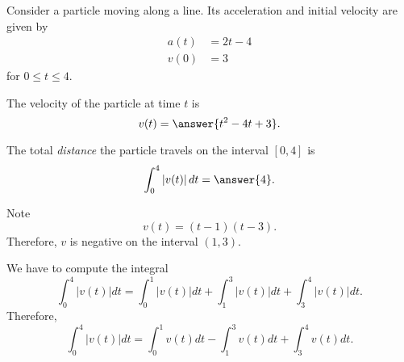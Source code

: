 \documentclass{ximera}
\author{Nela Lakos \and Kyle Parsons}
\begin{document}
\begin{exercise}

Consider a particle moving along a line.  Its acceleration and initial velocity are given by
\begin{align*}
a(t) &= 2t-4\\
v(0) &= 3
\end{align*}
for $0\leq t\leq4$.

The velocity of the particle at time $t$ is
\[
v(t) = \answer{t^2-4t+3}.
\]

The total \emph{distance} the particle travels on the interval $[0,4]$ is
\[
\int_0^4 \left|v(t)\right| dt = \answer{4}.
\]
\begin{hint}
Note
\[
v(t)=(t-1)(t-3).
\]
Therefore, $v$ is negative on the interval $(1,3)$.

\end{hint}
\begin{hint}
We have to compute the integral
\[
\int_0^4 \left|v(t)\right| dt =\int_0^1 \left|v(t)\right| dt+\int_1^3 \left|v(t)\right| dt+\int_3^4 \left|v(t)\right| dt.
\]
Therefore,
\[
\int_0^4 \left|v(t)\right| dt =\int_0^1 v(t) dt-\int_1^3v(t) dt+\int_3^4 v(t) dt.
\]

\end{hint}
\end{exercise}
\end{document}
